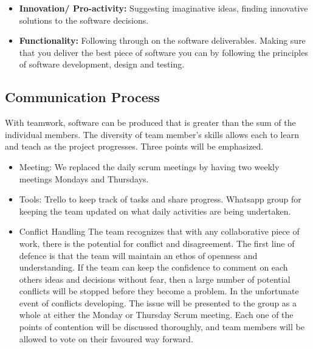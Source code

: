 \documentclass[11pt]{article}
\begin{document}
\begin{itemize}
	\item \textbf{Innovation/ Pro-activity:}
	 Suggesting imaginative ideas, finding innovative solutions to the software decisions.
	
	\item \textbf{Functionality:}
	 Following through on the software deliverables. Making sure that you deliver the best piece of software you can by following the principles of software development, design and testing.
\end{itemize}

 \subsection{Communication Process}
With teamwork, software can be produced that is greater than the sum of the individual members. The diversity of team member's skills allows each to learn and teach as the project progresses. Three points will be emphasized.
  \begin{itemize}
  	\item Meeting: We replaced the daily scrum meetings by having two weekly meetings Mondays and Thursdays.
 	\item Tools: Trello to keep track of tasks and share progress. Whatsapp group for keeping the team updated on what daily activities are being undertaken.
  	\item Conflict Handling
 \subitem The team recognizes that with any collaborative piece of work, there is the potential for conflict and disagreement. The first line of defence is that the team will maintain an ethos of openness and understanding. If the team can keep the confidence to comment on each others ideas and decisions without fear, then a large number of potential conflicts will be stopped before they become a problem.
 \subitem In the unfortunate event of conflicts developing. The issue will be presented to the group as a whole at either the Monday or Thursday Scrum meeting. Each one of the points of contention will be discussed thoroughly, and team members will be allowed to vote on their favoured way forward.
  \end{itemize}
\end{document}
